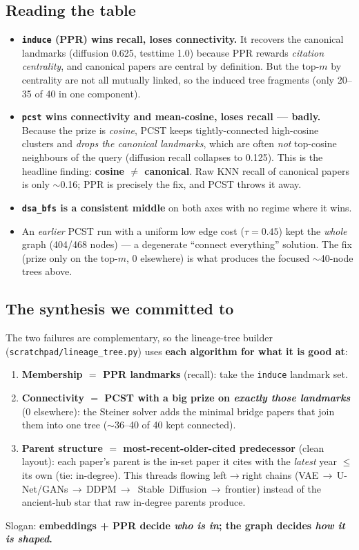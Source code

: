 \documentclass[11pt]{article}
\newcommand{\code}[1]{\texttt{\small #1}}
\begin{document}
\subsection*{Reading the table}
\begin{itemize}[leftmargin=1.4em,itemsep=2pt]
  \item \textbf{\code{induce} (PPR) wins recall, loses connectivity.} It recovers the canonical
  landmarks (diffusion 0.625, testtime 1.0) because PPR rewards \emph{citation centrality}, and
  canonical papers are central by definition. But the top-$m$ by centrality are not all mutually
  linked, so the induced tree fragments (only 20--35 of 40 in one component).
  \item \textbf{\code{pcst} wins connectivity and mean-cosine, loses recall --- badly.} Because the
  prize is \emph{cosine}, PCST keeps tightly-connected high-cosine clusters and \emph{drops the
  canonical landmarks}, which are often \emph{not} top-cosine neighbours of the query (diffusion
  recall collapses to 0.125). This is the headline finding: \textbf{cosine $\ne$ canonical}. Raw
  KNN recall of canonical papers is only $\sim$0.16; PPR is precisely the fix, and PCST throws it
  away.
  \item \textbf{\code{dsa\_bfs} is a consistent middle} on both axes with no regime where it wins.
  \item An \emph{earlier} PCST run with a uniform low edge cost ($\tau=0.45$) kept the
  \emph{whole} graph (404/468 nodes) --- a degenerate ``connect everything'' solution. The fix
  (prize only on the top-$m$, 0 elsewhere) is what produces the focused $\sim$40-node trees above.
\end{itemize}

\subsection*{The synthesis we committed to}
The two failures are complementary, so the lineage-tree builder
(\code{scratchpad/lineage\_tree.py}) uses \textbf{each algorithm for what it is good at}:
\begin{enumerate}[leftmargin=1.6em,itemsep=2pt]
  \item \textbf{Membership $=$ PPR landmarks} (recall): take the \code{induce} landmark set.
  \item \textbf{Connectivity $=$ PCST with a big prize on \emph{exactly those landmarks}} (0
  elsewhere): the Steiner solver adds the minimal bridge papers that join them into one tree
  ($\sim$36--40 of 40 kept connected).
  \item \textbf{Parent structure $=$ most-recent-older-cited predecessor} (clean layout): each
  paper's parent is the in-set paper it cites with the \emph{latest} year $\le$ its own (tie:
  in-degree). This threads flowing left$\to$right chains (VAE\,$\to$\,U-Net/GANs\,$\to$\,DDPM\,$\to$\,
  Stable~Diffusion\,$\to$\,frontier) instead of the ancient-hub star that raw in-degree parents produce.
\end{enumerate}
Slogan: \textbf{embeddings + PPR decide \emph{who is in}; the graph decides \emph{how it is shaped}.}
\end{document}
